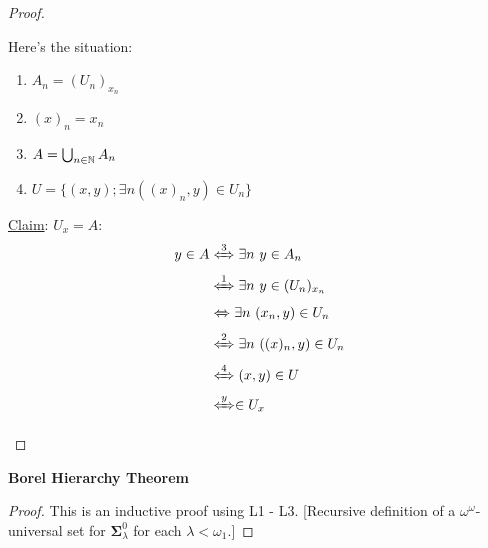 \documentclass[]{article}
\newcommand{\om}{\omega}
\newcommand{\bosig}{\bm{\Sigma}}
\begin{document}
\begin{proof}
\begin{itemize}
        Here's the situation:
        \begin{enumerate}
            \item $A_n = (U_n)_{x_n}$ 
            \item $(x)_n = x_n$ 
            \item $A = \bigcup_{n\in\mathbb{N}}A_n$
            \item $U = \{(x,y);\exists n ((x)_n,y)\in U_n\}$
        \end{enumerate}

        \underline{Claim}: $U_x = A$:
        \begin{align*}
            y \in A &\xLeftrightarrow{3} \exists n\ y\in A_n\\
            &\xLeftrightarrow{1}\exists n\ y \in (U_n)_{x_n}\\
            &\xLeftrightarrow{ } \exists n\ (x_n,y)\in U_n\\
            &\xLeftrightarrow{2} \exists n\ ((x)_n,y)\in U_n\\
            &\xLeftrightarrow{4} (x,y)\in U\\
            &\xLeftrightarrow y \in U_x
        \end{align*}
    \end{itemize}
\end{proof}

\begin{remark*}[Corollary] \textbf{Borel Hierarchy Theorem}
\end{remark*}
\begin{proof}
    This is an inductive proof using L1 - L3. [Recursive definition of a $\om^\om$-universal set for $\bosig_{\lambda}^0$ for each $\lambda < \om_1$.]
\end{proof}
\end{document}
